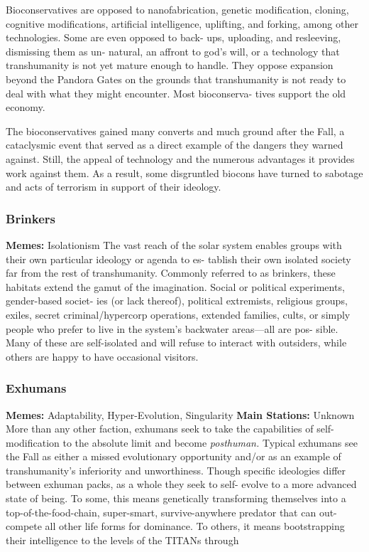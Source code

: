 Bioconservatives are opposed to nanofabrication, 
genetic modification, cloning, cognitive modifications, 
artificial intelligence, uplifting, and forking, among 
other technologies. Some are even opposed to back-
ups, uploading, and resleeving, dismissing them as un-
natural, an affront to god's will, or a technology that 
transhumanity is not yet mature enough to handle. 
They oppose expansion beyond the Pandora Gates on 
the grounds that transhumanity is not ready to deal 
with what they might encounter. Most bioconserva-
tives support the old economy.

The bioconservatives gained many converts and 
much ground after the Fall, a cataclysmic event 
that served as a direct example of the dangers they 
warned against. Still, the appeal of technology and 
the numerous advantages it provides work against 
them. As a result, some disgruntled biocons have 
turned to sabotage and acts of terrorism in support 
of their ideology.

\subsubsection{Brinkers}

\textbf{Memes:} Isolationism
The vast reach of the solar system enables groups 
with their own particular ideology or agenda to es-
tablish their own isolated society far from the rest 
of transhumanity. Commonly referred to as brinkers, 
these habitats extend the gamut of the imagination. 
Social or political experiments, gender-based societ-
ies (or lack thereof), political extremists, religious 
groups, exiles, secret criminal/hypercorp operations, 
extended families, cults, or simply people who prefer 
to live in the system's backwater areas—all are pos-
sible. Many of these are self-isolated and will refuse 
to interact with outsiders, while others are happy to 
have occasional visitors.

\subsubsection{Exhumans}

\textbf{Memes:} Adaptability, Hyper-Evolution, Singularity
\textbf{Main Stations:} Unknown
More than any other faction, exhumans seek to take 
the capabilities of self-modification to the absolute 
limit and become \textit{posthuman.} Typical exhumans see 
the Fall as either a missed evolutionary opportunity 
and/or as an example of transhumanity's inferiority 
and unworthiness. Though specific ideologies differ 
between exhuman packs, as a whole they seek to self-
evolve to a more advanced state of being. To some, 
this means genetically transforming themselves into a 
top-of-the-food-chain, super-smart, survive-anywhere 
predator that can out-compete all other life forms 
for dominance. To others, it means bootstrapping 
their intelligence to the levels of the TITANs through 

